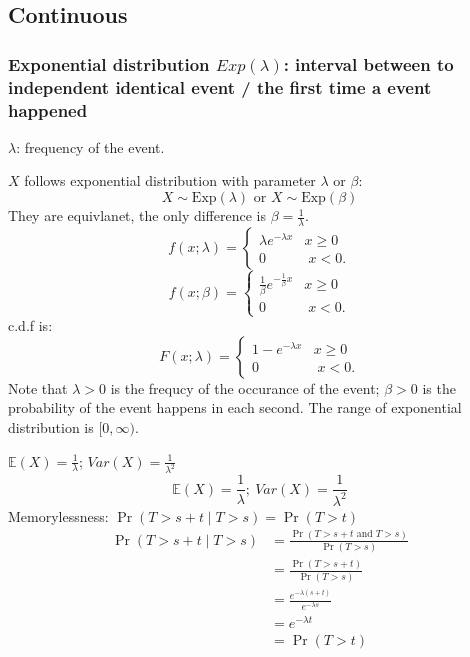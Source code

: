 \documentclass[11pt,a4paper]{article}
\begin{document}
\subsection{Continuous}
\subsubsection{Exponential distribution $Exp(\lambda)$: interval between to independent identical event / the first time a event happened}
$\lambda$: frequency of the event.

$X$ follows exponential distribution with parameter $\lambda$ or $\beta$:
$${\displaystyle X\sim {\text{Exp}}(\lambda )} \text{ or } {\displaystyle X\sim {\text{Exp}}(\beta )}$$
They are equivlanet, the only difference is $\beta=\frac{1}{\lambda}$.
$${f(x;{\lambda})=\left\{{\begin{matrix}{\lambda }e^{-{\lambda }x}&x\geq 0\\0&\;x<0.\end{matrix}}\right.}$$
$${f(x;{\beta})=\left\{{\begin{matrix}{\frac{1}{\beta} }e^{-{\frac{1}{\beta} }x}&x\geq 0\\0&\;x<0.\end{matrix}}\right.}$$
c.d.f is:
$${F(x;{\lambda})=\left\{{\begin{matrix}{1-}e^{-{\lambda }x}&x\geq 0\\0&\;x<0.\end{matrix}}\right.}$$
Note that $\lambda > 0$ is the frequcy of the occurance of the event; $\beta>0$ is the probability of the event happens in each second. The range of exponential distribution is $[0,\infty)$.

$\mathbb{E}(X)=\frac{1}{\lambda}$; $Var(X)=\frac{1}{\lambda^2}$
$$\mathbb{E}(X)=\frac{1}{\lambda};\ Var(X)=\frac{1}{\lambda^2}$$
Memorylessness: ${\displaystyle \Pr \left(T>s+t\mid T>s\right)=\Pr(T>t)}$
\begin{equation}
    \begin{aligned}
        \Pr (T>s+t\mid T>s)&=\frac{\Pr(T>s+t\text{ and }T>s)}{\Pr(T>s)}\\
        &=\frac{\Pr(T>s+t)}{\Pr(T>s)}\\
        &=\frac{e^{-\lambda(s+t)}}{e^{-\lambda s}}\\
        &=e^{-\lambda t}\\
        &=\Pr (T>t)
    \end{aligned}
    \nonumber
\end{equation}
\end{document}
